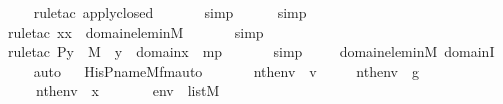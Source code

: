 \begin{isabellebody}
\ \ \ \isamarkupfalse%
{\isacharparenleft}{\kern0pt}rule{\isacharunderscore}{\kern0pt}tac\ apply{\isacharunderscore}{\kern0pt}closed{\isacharparenright}{\kern0pt}\ \isanewline
\ \ \ \ \isamarkupfalse%
\ simp\ \isanewline
\ \ \ \isamarkupfalse%
\ simp\ \isanewline
\ \ \ \isamarkupfalse%
{\isacharparenleft}{\kern0pt}rule{\isacharunderscore}{\kern0pt}tac\ x{\isacharequal}{\kern0pt}x\ \ domain{\isacharunderscore}{\kern0pt}elem{\isacharunderscore}{\kern0pt}in{\isacharunderscore}{\kern0pt}M{\isacharparenright}{\kern0pt}\ \isanewline
\ \ \ \ \isamarkupfalse%
\ simp\ \isanewline
\ \ \ \isamarkupfalse%
{\isacharparenleft}{\kern0pt}rule{\isacharunderscore}{\kern0pt}tac\ P{\isacharequal}{\kern0pt}{\isachardoublequoteopen}y\ {\isasymin}\ M\ {\isasymand}\ y\ {\isasymin}\ domain{\isacharparenleft}{\kern0pt}x{\isacharparenright}{\kern0pt}{\isachardoublequoteclose}\ \ mp{\isacharparenright}{\kern0pt}\ \isanewline
\ \ \ \ \isamarkupfalse%
\ simp\ \isanewline
\ \ \isamarkupfalse%
\ domain{\isacharunderscore}{\kern0pt}elem{\isacharunderscore}{\kern0pt}in{\isacharunderscore}{\kern0pt}M\ domainI\ \isanewline
\ \ \isamarkupfalse%
\ auto%
\endisatagproof
{\isafoldproof}%
%
\isadelimproof
\ \isanewline
%
\endisadelimproof
\isanewline
{}\isamarkupfalse%
\ His{\isacharunderscore}{\kern0pt}P{\isacharunderscore}{\kern0pt}name{\isacharunderscore}{\kern0pt}M{\isacharunderscore}{\kern0pt}fm{\isacharunderscore}{\kern0pt}auto{\isacharcolon}{\kern0pt}\isanewline
\ \ \isanewline
\ \ \ \ {\isachardoublequoteopen}nth{\isacharparenleft}{\kern0pt}{}{\isacharcomma}{\kern0pt}env{\isacharparenright}{\kern0pt}\ {\isacharequal}{\kern0pt}\ v{\isachardoublequoteclose}\ \isanewline
\ \ \ \ {\isachardoublequoteopen}nth{\isacharparenleft}{\kern0pt}{}{\isacharcomma}{\kern0pt}env{\isacharparenright}{\kern0pt}\ {\isacharequal}{\kern0pt}\ g{\isachardoublequoteclose}\ \isanewline
\ \ \ \ {\isachardoublequoteopen}nth{\isacharparenleft}{\kern0pt}{}{\isacharcomma}{\kern0pt}env{\isacharparenright}{\kern0pt}\ {\isacharequal}{\kern0pt}\ x{\isacharprime}{\kern0pt}{\isachardoublequoteclose}\ \ \ \isanewline
\ \ \ \ {\isachardoublequoteopen}env\ {\isasymin}\ list{\isacharparenleft}{\kern0pt}M{\isacharparenright}{\kern0pt}{\isachardoublequoteclose}\ \isanewline
\ \ \isanewline

\end{isabellebody}
